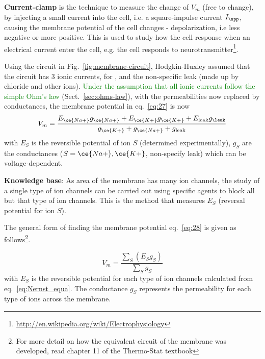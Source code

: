 {\bf Current-clamp} is the technique to measure the change of $V_m$ (free to
change), by injecting a small current into the cell, i.e. a  square-impulse current $I_\app$,
causing the membrane potential of the cell changes - depolarization, i.e less
negative or more positive. This is used to study how the cell response when an
electrical current enter the cell, e.g. the cell responds to
neurotransmitter\footnote{\url{http://en.wikipedia.org/wiki/Electrophysiology}}.


Using the circuit in Fig.~\ref{fig:membrane-circuit}, Hodgkin-Huxley assumed
that the circuit has 3 ionic currents, for ,  and the
non-specific leak (made up by chloride and other ions).
\textcolor{green}{Under the assumption that all ionic currents follow
  the simple Ohm's law} (Sect.~\ref{sec:ohms-law}), with the permeabilities now
  replaced by conductances, the membrane potential in eq.~\eqref{eq:27} is now
\begin{equation}
  \label{eq:28}
  V_m = \frac{E_{\ce{Na+}} g_{\ce{Na+}} + E_{\ce{K+}} g_{\ce{K+}} +  E_\text{leak}
    g_{\leak}}{  g_{\ce{K+}} +   g_{\ce{Na+}} +   g_\text{leak}}
\end{equation}
with $E_S$ is the reversible potential of ion $S$ (determined
experimentally), $g_S$ are the
conductances ($S=\ce{Na+}, \ce{K+}$, non-specify leak) which can be
voltage-dependent.

\begin{mdframed}
  {\bf Knowledge base}: As area of the membrane has many ion channels,
  the study of a single type of ion channels can be carried out using
  specific agents to block all but that type of ion channels. This is
  the method that measures $E_S$ (reversal potential for ion $S$).
\end{mdframed}

The general form of finding the membrane potential eq.~\eqref{eq:28} is given as
follows\footnote{For more detail on how the equivalent circuit of the
  membrane was developed, read chapter 11 of the Thermo-Stat
  textbook}.

\begin{equation}
  \label{eq:27}
  V_m = \frac{\sum_S (E_Sg_S)}{\sum_S g_S}
\end{equation}
with $E_S$ is the reversible potential for each type of ion channels
calculated from eq.~\eqref{eq:Nernst_equa}.  The conductance $g_S$ represents
the permeability for each type of ions across the membrane. 

